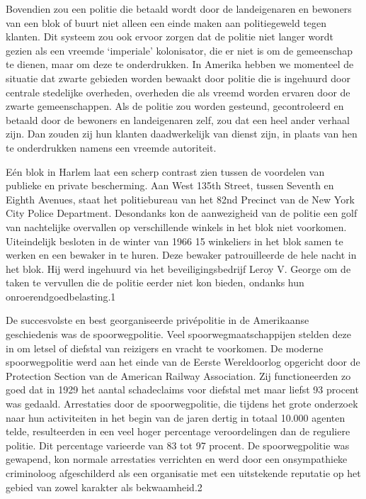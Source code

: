 \documentclass[
  a5paper,
  smalldemyvopaper,10pt,twoside,onecolumn,openright,extrafontsizes,hidelinks]{memoir}
\begin{document}
Bovendien zou een politie die betaald wordt door de landeigenaren en
bewoners van een blok of buurt niet alleen een einde maken aan
politiegeweld tegen klanten. Dit systeem zou ook ervoor zorgen dat de
politie niet langer wordt gezien als een vreemde `imperiale'
kolonisator, die er niet is om de gemeenschap te dienen, maar om deze te
onderdrukken. In Amerika hebben we momenteel de situatie dat zwarte
gebieden worden bewaakt door politie die is ingehuurd door centrale
stedelijke overheden, overheden die als vreemd worden ervaren door de
zwarte gemeenschappen. Als de politie zou worden gesteund, gecontroleerd
en betaald door de bewoners en landeigenaren zelf, zou dat een heel
ander verhaal zijn. Dan zouden zij hun klanten daadwerkelijk van dienst
zijn, in plaats van hen te onderdrukken namens een vreemde autoriteit.

Eén blok in Harlem laat een scherp contrast zien tussen de voordelen van
publieke en private bescherming. Aan West 135th Street, tussen Seventh
en Eighth Avenues, staat het politiebureau van het 82nd Precinct van de
New York City Police Department. Desondanks kon de aanwezigheid van de
politie een golf van nachtelijke overvallen op verschillende winkels in
het blok niet voorkomen. Uiteindelijk besloten in de winter van 1966 15
winkeliers in het blok samen te werken en een bewaker in te huren. Deze
bewaker patrouilleerde de hele nacht in het blok. Hij werd ingehuurd via
het beveiligingsbedrijf Leroy V. George om de taken te vervullen die de
politie eerder niet kon bieden, ondanks hun onroerendgoedbelasting.1

De succesvolste en best georganiseerde privépolitie in de Amerikaanse
geschiedenis was de spoorwegpolitie. Veel spoorwegmaatschappijen stelden
deze in om letsel of diefstal van reizigers en vracht te voorkomen. De
moderne spoorwegpolitie werd aan het einde van de Eerste Wereldoorlog
opgericht door de Protection Section van de American Railway
Association. Zij functioneerden zo goed dat in 1929 het aantal
schadeclaims voor diefstal met maar liefst 93 procent was gedaald.
Arrestaties door de spoorwegpolitie, die tijdens het grote onderzoek
naar hun activiteiten in het begin van de jaren dertig in totaal 10.000
agenten telde, resulteerden in een veel hoger percentage veroordelingen
dan de reguliere politie. Dit percentage varieerde van 83 tot 97
procent. De spoorwegpolitie was gewapend, kon normale arrestaties
verrichten en werd door een onsympathieke criminoloog afgeschilderd als
een organisatie met een uitstekende reputatie op het gebied van zowel
karakter als bekwaamheid.2
\end{document}
